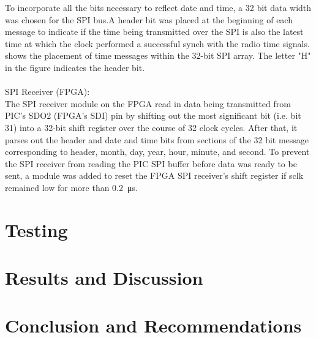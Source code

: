 \documentclass[11pt]{article}
\begin{document}
To incorporate all the bits necessary to reflect date and time, a 32 bit data width was chosen for the SPI bus.A header bit was placed at the beginning of each message to indicate if the time being transmitted over the SPI is also the latest time at which the clock performed a successful synch with the radio time signals. %
shows the placement of time messages within the 32-bit SPI array. The letter "H" in the figure indicates the header bit.\\  
\\
SPI Receiver (FPGA):\\
The SPI receiver module on the FPGA read in data being transmitted from PIC’s SDO2 (FPGA’s SDI) pin by shifting out the most significant bit (i.e. bit 31) into a 32-bit shift register over the course of 32 clock cycles. After that, it parses out the header and date and time bits from sections of the 32 bit message corresponding to header, month, day, year, hour, minute, and second. To prevent the SPI receiver from reading the PIC SPI buffer before data was ready to be sent, a module was added to reset the FPGA SPI receiver's shift register if sclk remained low for more than \SI{0.2}{\micro \second}.

\section{Testing}



\section{Results and Discussion}



\section{Conclusion and Recommendations}
\end{document}
